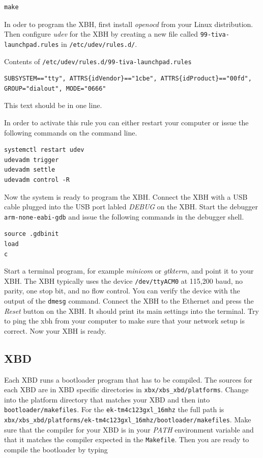 \documentclass[twoside,11pt]{cergdoc}
\begin{document}
\begin{lstlisting}
make
\end{lstlisting}

In oder to program the XBH, first install \emph{openocd} from your Linux distribution.
Then configure \emph{udev} for the XBH by creating a new file called
\texttt{99-tiva-launchpad.rules} in \verb|/etc/udev/rules.d/|.

\begin{cergbox}{Contents of \texttt{/etc/udev/rules.d/99-tiva-launchpad.rules}}
\small\begin{lstlisting}
SUBSYSTEM=="tty", ATTRS{idVendor}=="1cbe", ATTRS{idProduct}=="00fd", 
GROUP="dialout", MODE="0666"
\end{lstlisting}
This text should be in one line.
\end{cergbox}

In order to activate this rule you can either restart your computer or issue the
following commands on the command line.

\begin{lstlisting}
systemctl restart udev 
udevadm trigger
udevadm settle
udevadm control -R
\end{lstlisting}

Now the system is ready to program the XBH. Connect the XBH with a USB cable plugged into
the USB port labled \emph{DEBUG} on the XBH. Start the debugger \verb|arm-none-eabi-gdb|
and issue the following commands in the debugger shell.

\begin{lstlisting}
source .gdbinit
load
c
\end{lstlisting}

Start a terminal program, for example \emph{minicom} or \emph{gtkterm}, 
and point it to your XBH. The XBH typically uses the device \verb|/dev/ttyACM0| at 115,200 baud, no parity, 
one stop bit, and no flow control.
You can verify the device with the output of the \texttt{dmesg} command. Connect the XBH to the
Ethernet and press the \emph{Reset} button on the XBH. It should print its main 
settings into the terminal. Try to ping the xbh from your computer to make sure that your 
network setup is correct. Now your XBH is ready.

\subsection{XBD}
Each XBD runs a bootloader program that has to be compiled. The sources for each XBD
are in XBD specific directories in 
\verb|xbx/xbs_xbd/platforms|.
Change into the platform directory that matches your XBD and then into 
\texttt{bootloader/makefiles}. For the \verb|ek-tm4c123gxl_16mhz| the full path is
\verb|xbx/xbs_xbd/platforms/ek-tm4c123gxl_16mhz/bootloader/makefiles|.
Make sure that the compiler for your XBD is in your \emph{PATH} environment
variable and that it matches the compiler expected in the \texttt{Makefile}.
Then you are ready to compile the bootloader by typing
\end{document}
